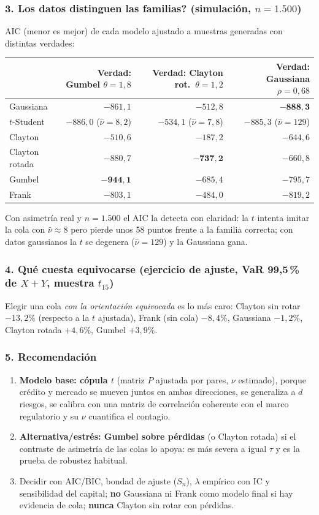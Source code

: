 \documentclass[a4paper,12pt]{article}
\begin{document}
\subsubsection*{3. \textquestiondown{}Los datos distinguen las familias? (simulación, $n=1.500$)}
AIC (menor es mejor) de cada modelo ajustado a muestras generadas con distintas verdades:
\begin{center}
\small
\begin{tabular}{lrrr}
\toprule
 & Verdad: Gumbel $\theta=1{,}8$ & Verdad: Clayton rot.\ $\theta=1{,}2$ & Verdad: Gaussiana $\rho=0{,}68$\\
\midrule
Gaussiana & $-861{,}1$ & $-512{,}8$ & $\mathbf{-888{,}3}$\\
$t$-Student & $-886{,}0$ ($\hat\nu=8{,}2$) & $-534{,}1$ ($\hat\nu=7{,}8$) & $-885{,}3$ ($\hat\nu=129$)\\
Clayton & $-510{,}6$ & $-187{,}2$ & $-644{,}6$\\
Clayton rotada & $-880{,}7$ & $\mathbf{-737{,}2}$ & $-660{,}8$\\
Gumbel & $\mathbf{-944{,}1}$ & $-685{,}4$ & $-795{,}7$\\
Frank & $-803{,}1$ & $-484{,}0$ & $-819{,}2$\\
\bottomrule
\end{tabular}
\end{center}
Con asimetría real y $n=1.500$ el AIC la detecta con claridad: la $t$ intenta imitar la cola con $\hat\nu\approx8$ pero pierde unos 58 puntos frente a la familia correcta; con datos gaussianos la $t$ se degenera ($\hat\nu=129$) y la Gaussiana gana.

\subsubsection*{4. Qué cuesta equivocarse (ejercicio de ajuste, VaR 99,5\,\% de $X+Y$, muestra $t_{15}$)}
Elegir una cola \emph{con la orientación equivocada} es lo más caro: Clayton sin rotar $-13{,}2\%$ (respecto a la $t$ ajustada), Frank (sin cola) $-8{,}4\%$, Gaussiana $-1{,}2\%$, Clayton rotada $+4{,}6\%$, Gumbel $+3{,}9\%$.

\subsubsection*{5. Recomendación}
\begin{enumerate}[leftmargin=*,itemsep=2pt]
\item \textbf{Modelo base: cópula $t$} (matriz $P$ ajustada por pares, $\nu$ estimado), porque crédito y mercado se mueven juntos en ambas direcciones, se generaliza a $d$ riesgos, se calibra con una matriz de correlación coherente con el marco regulatorio y su $\nu$ cuantifica el contagio.
\item \textbf{Alternativa/estrés: Gumbel sobre pérdidas} (o Clayton rotada) si el contraste de asimetría de las colas lo apoya: es más severa a igual $\tau$ y es la prueba de robustez habitual.
\item Decidir con AIC/BIC, bondad de ajuste ($S_n$), $\lambda$ empírico con IC y sensibilidad del capital; \textbf{no} Gaussiana ni Frank como modelo final si hay evidencia de cola; \textbf{nunca} Clayton sin rotar con pérdidas.
\end{enumerate}
\end{document}
